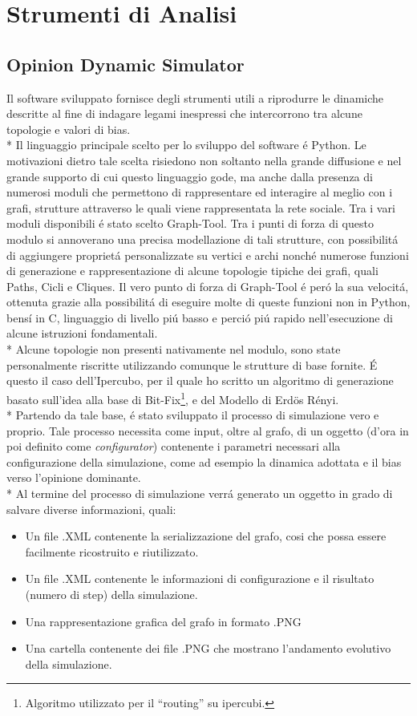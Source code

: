 \documentclass[../Tesi.tex]{subfiles}
\begin{document}
\chapter{Strumenti di Analisi}
\section{Opinion Dynamic Simulator}
Il software sviluppato fornisce degli strumenti utili a riprodurre le dinamiche descritte al fine di indagare legami inespressi che intercorrono tra alcune topologie e valori di bias.\\*
Il linguaggio principale scelto per lo sviluppo del software \'e Python. Le motivazioni dietro tale scelta risiedono non soltanto nella grande diffusione e nel grande supporto di cui questo linguaggio gode, ma anche dalla presenza di numerosi moduli che permettono di rappresentare ed interagire al meglio con i grafi, strutture attraverso le quali viene rappresentata la rete sociale.
Tra i vari moduli disponibili \'e stato scelto Graph-Tool. Tra i punti di forza di questo modulo si annoverano una precisa modellazione di tali strutture, con possibilit\'a di aggiungere propriet\'a personalizzate su vertici e archi nonch\'e numerose funzioni di generazione e rappresentazione di alcune topologie tipiche dei grafi, quali Paths, Cicli e Cliques. Il vero punto di forza di Graph-Tool \'e per\'o la sua velocit\'a, ottenuta grazie alla possibilit\'a di eseguire molte di queste funzioni non in Python, bens\'i in C, linguaggio di livello pi\'u basso e perci\'o pi\'u rapido nell'esecuzione di alcune istruzioni fondamentali.\\*
Alcune topologie non presenti nativamente nel modulo, sono state personalmente riscritte utilizzando comunque le strutture di base fornite. \'E questo il caso dell'Ipercubo, per il quale ho scritto un algoritmo di generazione basato sull'idea alla base di Bit-Fix\footnote{Algoritmo utilizzato per il ``routing'' su ipercubi.}, e del Modello di Erd{\"o}s R\'enyi.\\*
Partendo da tale base, \'e stato sviluppato il processo di simulazione vero e proprio. Tale processo necessita come input, oltre al grafo, di un oggetto (d'ora in poi definito come \emph{configurator}) contenente i parametri necessari alla configurazione della simulazione, come ad esempio la dinamica adottata e il bias verso l'opinione dominante.\\* 
Al termine del processo di simulazione verr\'a generato un oggetto in grado di salvare diverse informazioni, quali:
\begin{itemize}
\item Un file .XML contenente la serializzazione del grafo, cosi che possa essere facilmente ricostruito e riutilizzato.
\item Un file .XML contenente le informazioni di configurazione e il risultato (numero di step) della simulazione.
\item Una rappresentazione grafica del grafo in formato .PNG
\item Una cartella contenente dei file .PNG che mostrano l'andamento evolutivo della simulazione.
\end{itemize}
\end{document}
